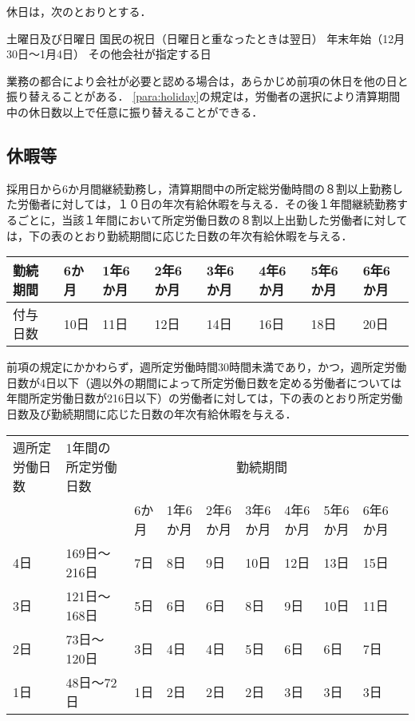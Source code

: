 \documentclass[11pt,a4paper]{jsarticle}
\begin{document}
休日は，次のとおりとする．
\label{para:holiday}
\begin{enumerate}
	\itm 土曜日及び日曜日
	\itm 国民の祝日（日曜日と重なったときは翌日）
	\itm 年末年始（12月30日～1月4日）
	\itm その他会社が指定する日
\end{enumerate}
\term
業務の都合により会社が必要と認める場合は，あらかじめ前項の休日を他の日と振り替えることがある．
\term
\ref{para:holiday}の規定は，労働者の選択により清算期間中の休日数以上で任意に振り替えることができる．


\subsection{休暇等}
採用日から6か月間継続勤務し，清算期間中の所定総労働時間の８割以上勤務した労働者に対しては，１０日の年次有給休暇を与える．その後１年間継続勤務するごとに，当該１年間において所定労働日数の８割以上出勤した労働者に対しては，下の表のとおり勤続期間に応じた日数の年次有給休暇を与える．	\begin{tabular}{|l|p{2.5em}|p{2.5em}|p{2.5em}|p{2.5em}|p{2.5em}|p{2.5em}|p{2.5em}|} \hline
	勤続期間 & 6か月 & 1年6か月& 2年6か月& 3年6か月& 4年6か月& 5年6か月& 6年6か月 \\ \hline \hline
	付与日数 & 10日 & 11日& 12日& 14日& 16日& 18日& 20日 \\ \hline
\end{tabular}
\label{para:paid_vacation}
\term
前項の規定にかかわらず，週所定労働時間30時間未満であり，かつ，週所定労働日数が4日以下（週以外の期間によって所定労働日数を定める労働者については年間所定労働日数が216日以下）の労働者に対しては，下の表のとおり所定労働日数及び勤続期間に応じた日数の年次有給休暇を与える．
\begin{tabular}{|p{3em}|p{4em}|p{2.5em}|p{2.5em}|p{2.5em}|p{2.5em}|p{2.5em}|p{2.5em}|p{2.5em}|p{2.5em}|} \hline
	週所定労働日数 & 1年間の所定労働日数 & \multicolumn{7}{|c|}{勤続期間} \\ \cline{3-9}
	& & 6か月 & 1年6か月& 2年6か月& 3年6か月& 4年6か月& 5年6か月& 6年6か月 \\ \hline \hline
	4日 & 169日～216日 & 7日 & 8日& 9日& 10日& 12日& 13日& 15日 \\ \hline
	3日 & 121日～168日 & 5日 & 6日& 6日&  8日&  9日& 10日& 11日 \\ \hline
	2日 & 73日～120日  & 3日 & 4日& 4日&  5日&  6日&  6日&  7日 \\ \hline
	1日 & 48日～72日   & 1日 & 2日& 2日&  2日&  3日&  3日&  3日 \\ \hline
\end{tabular}
\end{document}
